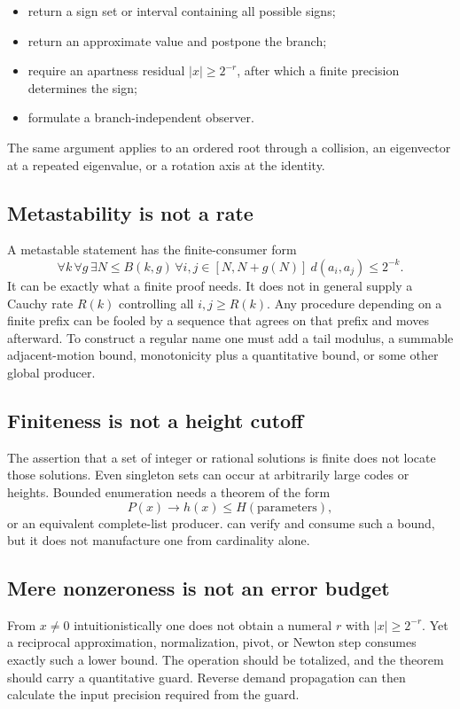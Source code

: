\begin{itemize}
\item return a sign set or interval containing all possible signs;
\item return an approximate value and postpone the branch;
\item require an apartness residual \(|x|\ge 2^{-r}\), after which a finite
  precision determines the sign;
\item formulate a branch-independent observer.
\end{itemize}

The same argument applies to an ordered root through a collision, an eigenvector
at a repeated eigenvalue, or a rotation axis at the identity.

\subsection{Metastability is not a rate}

A metastable statement has the finite-consumer form
\[
  \forall k\,\forall g\,\exists N\le B(k,g)\,
  \forall i,j\in[N,N+g(N)]\ d(a_i,a_j)\le 2^{-k}.
\]
It can be exactly what a finite proof needs.  It does not in general supply a
Cauchy rate \(R(k)\) controlling all \(i,j\ge R(k)\).  Any procedure depending
on a finite prefix can be fooled by a sequence that agrees on that prefix and
moves afterward.  To construct a regular name one must add a tail modulus, a
summable adjacent-motion bound, monotonicity plus a quantitative bound, or some
other global producer.

\subsection{Finiteness is not a height cutoff}

The assertion that a set of integer or rational solutions is finite does not
locate those solutions.  Even singleton sets can occur at arbitrarily large
codes or heights.  Bounded enumeration needs a theorem of the form
\[
  P(x)\longrightarrow h(x)\le H(\text{parameters}),
\]
or an equivalent complete-list producer.  \Scope can verify and consume such a
bound, but it does not manufacture one from cardinality alone.

\subsection{Mere nonzeroness is not an error budget}

From \(x\neq0\) intuitionistically one does not obtain a numeral \(r\) with
\(|x|\ge 2^{-r}\).  Yet a reciprocal approximation, normalization, pivot, or
Newton step consumes exactly such a lower bound.  The operation should be
totalized, and the theorem should carry a quantitative guard.  Reverse demand
propagation can then calculate the input precision required from the guard.

